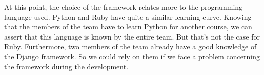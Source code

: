 \documentclass[11pt, a4paper]{article}   	%
\begin{document}
\medskip
At this point, the choice of the framework relates more to the programming language used.
Python and Ruby have quite a similar learning curve.
Knowing that the members of the team have to learn Python for another course, we can assert that this language is known by the entire team.
But that's not the case for Ruby.
Furthermore, two members of the team already have a good knowledge of the Django framework.
So we could rely on them if we face a problem concerning the framework during the development.
\end{document}
